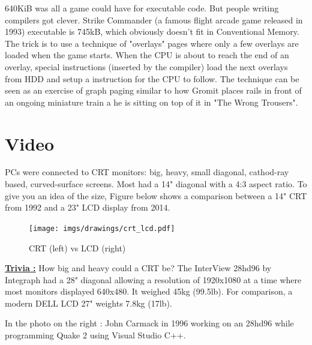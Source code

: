 \documentclass[book.tex]{subfiles}
\begin{document}
\par
{} 640KiB was all a game could have for executable code. But people writing compilers got clever. Strike Commander (a famous flight arcade game released in 1993) executable is 745kB, which obviously doesn't fit in Conventional Memory. The trick is to use a technique of "overlays" pages where only a few overlays are loaded when the game starts. When the CPU is about to reach the end of an overlay, special instructions (inserted by the compiler) load the next overlays from HDD and setup a  instruction for the CPU to follow. The technique can be seen as an exercise of graph paging similar to how Gromit places rails in front of an ongoing miniature train a he is sitting on top of it in "The Wrong Trousers".

















\section{Video}

PCs were connected to CRT monitors: big, heavy, small diagonal, cathod-ray based, curved-surface screens. Most had a 14" diagonal with a 4:3 aspect ratio. To give you an idea of the size, Figure below shows a comparison between a 14" CRT from 1992 and a 23" LCD display from 2014.\\

\begin{figure}[H]
\centering
\texttt{[image: imgs/drawings/crt\_lcd.pdf]}
\caption{CRT (left) vs LCD (right)}
\label{fig:lcd_vs_crt}
\end{figure}

\begin{minipage}{.4\textwidth}
\textbf{\underline{Trivia :}} How big and heavy could a CRT be? The InterView 28hd96 by Integraph had a 28" diagonal allowing a resolution of 1920x1080 at a time where most monitors displayed 640x480. It weighed 45kg (99.5lb). For comparison, a modern DELL LCD 27" weights 7.8kg (17lb).\\
\par
In the photo on the right : John Carmack in 1996 working on an 28hd96 while programming Quake 2 using Visual Studio C++.\\
\end{minipage}
\begin{minipage}{.6\textwidth}
\begin{figure}[H]
  \begin{flushright}
    \end{flushright}
\end{figure}
\end{minipage}
\end{document}
